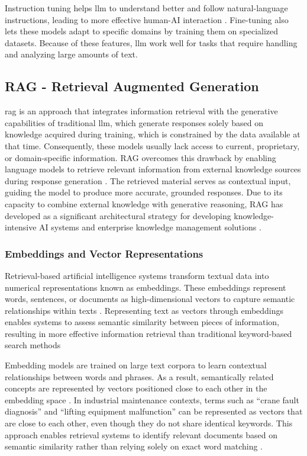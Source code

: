 Instruction tuning helps \gls{llm} to understand better and follow natural-language instructions, leading to more effective human-AI interaction \cite{ouyang2022traininglanguagemodelsfollow}. Fine-tuning also lets these models adapt to specific domains by training them on specialized datasets\cite{llmfinetuning2024}. Because of these features, \gls{llm} work well for tasks that require handling and analyzing large amounts of text.


\subsection{RAG - Retrieval Augmented 
Generation\label{sec:RAG}}
\acrfull{rag} is an approach that integrates information retrieval with the generative capabilities of traditional \acrfull{llm}, which generate responses solely based on knowledge acquired during training, which is constrained by the data available at that time. Consequently, these models usually lack access to current, proprietary, or domain-specific information. RAG overcomes this drawback by enabling language models to retrieve relevant information from external knowledge sources during response generation \cite{IBM2023RAG}. The retrieved material serves as contextual input, guiding the model to produce more accurate, grounded responses. Due to its capacity to combine external knowledge with generative reasoning, RAG has developed as a significant architectural strategy for developing knowledge-intensive AI systems and enterprise knowledge management solutions \cite{WikipediaRAG2024}\cite{Holvoet2025RAG}.

\subsubsection{Embeddings and Vector Representations \label{sec:Embeddings and Vector Representations}}
Retrieval-based artificial intelligence systems transform textual data into numerical representations known as embeddings. These embeddings represent words, sentences, or documents as high-dimensional vectors to capture semantic relationships within texts \cite{chen_application_2025}. Representing text as vectors through embeddings enables systems to assess semantic similarity between pieces of information, resulting in more effective information retrieval than traditional keyword-based search methods \cite{Holvoet2025RAG}

Embedding models are trained on large text corpora to learn contextual relationships between words and phrases. As a result, semantically related concepts are represented by vectors positioned close to each other in the embedding space \cite{chen_application_2025}.
In industrial maintenance contexts, terms such as “crane fault diagnosis” and “lifting equipment malfunction” can be represented as vectors that are close to each other, even though they do not share identical keywords. This approach enables retrieval systems to identify relevant documents based on semantic similarity rather than relying solely on exact word matching \cite{Rusum2024VectorDB}.


